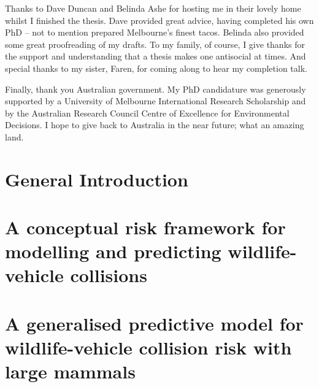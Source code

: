 \documentclass[titlesmallcaps,copyrightpage,examinerscopy]{uomthesis}
\begin{document}
Thanks to Dave Duncan and Belinda Ashe for hosting me in their lovely home whilst I finished the thesis. Dave provided great advice, having completed his own PhD -- not to mention prepared Melbourne's finest tacos. Belinda also provided some great proofreading of my drafts. To my family, of course, I give thanks for the support and understanding that a thesis makes one antisocial at times. And special thanks to my sister, Faren, for coming along to hear my completion talk.

Finally, thank you Australian government. My PhD candidature was generously supported by a University of Melbourne International Research Scholarship and by the Australian Research Council Centre of Excellence for Environmental Decisions. I hope to give back to Australia in the near future; what an amazing land.
\clearpage{\pagestyle{empty}\cleardoublepage}

\tableofcontents
\clearpage{\pagestyle{empty}\cleardoublepage}

\listoffigures
\clearpage{\pagestyle{empty}\cleardoublepage}

\listoftables
\clearpage{\pagestyle{empty}\cleardoublepage}

\mainmatter

%
\chapter{General Introduction}\label{sec:intro}
\clearpage{\pagestyle{empty}\cleardoublepage}

%
\chapter{A conceptual risk framework for modelling and predicting wildlife-vehicle collisions}\label{sec:egk}
\clearpage{\pagestyle{empty}\cleardoublepage}


\clearpage{\pagestyle{empty}\cleardoublepage}

%
\chapter{A generalised predictive model for wildlife-vehicle collision risk with large mammals}\label{sec:cal}
\clearpage{\pagestyle{empty}\cleardoublepage}
\end{document}

